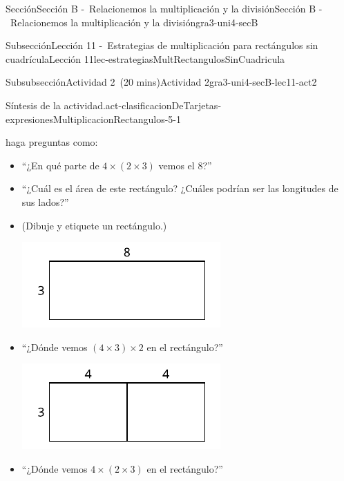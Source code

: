 \documentclass[oneside,10pt,]{article}
\begin{document}
\begin{sectionptx}{Sección}{Sección B -~Relacionemos la multiplicación y la división}{}{Sección B -~Relacionemos la multiplicación y la división}{}{}{gra3-uni4-secB}
\begin{subsectionptx}{Subsección}{Lección 11 -~Estrategias de multiplicación para rectángulos sin cuadrícula}{}{Lección 11}{}{}{lec-estrategiasMultRectangulosSinCuadricula}
\begin{subsubsectionptx}{Subsubsección}{Actividad 2~(20 mins)}{}{Actividad 2}{}{}{gra3-uni4-secB-lec11-act2}
\begin{paragraphs}{Síntesis de la actividad.}{act-clasificacionDeTarjetas-expresionesMultiplicacionRectangulos-5-1}
\begin{itemize}[label=\textbullet]
\par
haga preguntas como:%
%
\begin{itemize}[label=$\circ$]
\item{}``¿En qué parte de \(4 \times (2 \times 3)\) vemos el 8?''%
\item{}``¿Cuál es el área de este rectángulo? ¿Cuáles podrían ser las longitudes de sus lados?''%
\item{}(Dibuje y etiquete un rectángulo.)%
\begin{image}{0}{1}{0}{}%
\includegraphics[width=\linewidth]{external/svg-source/tikz-file-158677.pdf}
\end{image}%
\item{}``¿Dónde vemos \((4 \times 3) \times 2\) en el rectángulo?''%
\begin{image}{0}{1}{0}{}%
\includegraphics[width=\linewidth]{external/svg-source/tikz-file-158676.pdf}
\end{image}%
\item{}``¿Dónde vemos \(4 \times (2 \times 3)\) en el rectángulo?''%
\begin{image}{0}{1}{0}{}%

\end{image}
\end{itemize}
\end{itemize}
\end{paragraphs}
\end{subsubsectionptx}
\end{subsectionptx}
\end{sectionptx}
\end{document}

